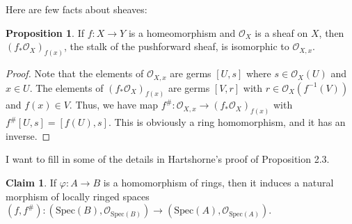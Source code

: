 \documentclass[aps,pra,showpacs,notitlepage,onecolumn,superscriptaddress,nofootinbib]{revtex4-1}
\theoremstyle{definition}
\newtheorem{claim}{Claim}[section]
\newtheorem{prop}{Proposition}[section]
\begin{document}
\noindent Here are few facts about sheaves:

\begin{prop}
  If $f : X \rightarrow Y$ is a homeomorphism and $\mathcal{O}_X$ is a sheaf on $X$, then $(f_{*} \mathcal{O}_X)_{f(x)}$, the stalk of the pushforward sheaf, is
  isomorphic to $\mathcal{O}_{X, x}$.
  \end{prop}

\begin{proof}
  Note that the elements of $\mathcal{O}_{X, x}$ are germs $[U, s]$ where $s \in \mathcal{O}_X(U)$ and $x \in U$. The elements of $(f_{*} \mathcal{O}_X)_{f(x)}$ are germs $[V, r]$
  with $r \in \mathcal{O}_X(f^{-1}(V))$ and $f(x) \in V$. Thus, we have map $f^{\#} : \mathcal{O}_{X, x} \rightarrow (f_{*} \mathcal{O}_X)_{f(x)}$ with $f^{\#}[U, s] = [f(U), s]$.
  This is obviously a ring homomorphism, and it has an inverse.
  \end{proof}

\noindent I want to fill in some of the details in Hartshorne's proof of Proposition 2.3.

\begin{claim}
  If $\varphi : A \rightarrow B$ is a homomorphism of rings, then it induces a natural morphism of locally ringed spaces $(f, f^{\#}) : (\text{Spec}(B), \mathcal{O}_{\text{Spec}(B)}) \rightarrow (\text{Spec}(A), \mathcal{O}_{\text{Spec}(A)})$.
  \end{claim}
\end{document}
